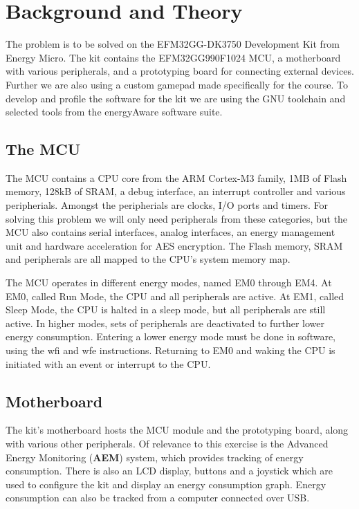 \chapter{Background and Theory}
The problem is to be solved on the EFM32GG-DK3750 Development Kit from Energy
Micro. The kit contains the EFM32GG990F1024 MCU, a motherboard with various
peripherals, and a prototyping board for connecting external devices. Further we
are also using a custom gamepad made specifically for the course. To develop and
profile the software for the kit we are using the GNU toolchain and selected
tools from the energyAware software suite.

\section{The MCU}

The MCU contains a CPU core from the ARM Cortex-M3 family, 1MB of Flash memory,
128kB of SRAM, a debug interface, an interrupt controller and various
peripherials. Amongst the peripherials are clocks, I/O ports and timers. For
solving this problem we will only need peripherals from these categories, but
the MCU also contains serial interfaces, analog interfaces, an energy management
unit and hardware acceleration for AES encryption. The Flash memory, SRAM and
peripherals are all mapped to the CPU's system memory map.

The MCU operates in different energy modes, named EM0 through EM4. At EM0,
called Run Mode, the CPU and all peripherals are active. At EM1, called Sleep
Mode, the CPU is halted in a sleep mode, but all peripherals are still active.
In higher modes, sets of peripherals are deactivated to further lower energy
consumption. Entering a lower energy mode must be done in software, using the
wfi and wfe instructions. Returning to EM0 and waking the CPU is initiated with
an event or interrupt to the CPU.

\section{Motherboard}

The kit's motherboard hosts the MCU module and the prototyping board, along with
various other peripherals. Of relevance to this exercise is the Advanced Energy
Monitoring (\textbf{AEM}) system, which provides tracking of energy consumption.
There is also an LCD display, buttons and a joystick which are used to configure
the kit and display an energy consumption graph. Energy consumption can also be
tracked from a computer connected over USB.

